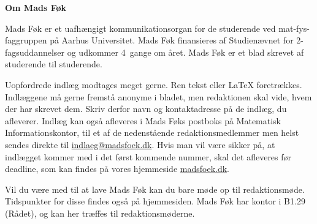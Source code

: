 \noindent\textbf{Om Mads Føk}

\noindent Mads Føk er et uafhængigt kommunikationsorgan for de studerende ved
mat-fys-faggruppen på Aarhus Universitet. Mads Føk finansieres af Studienævnet
for 2-fagsuddannelser og udkommer 4~gange om året. Mads Føk er et blad skrevet
af studerende til studerende.
\vspace{1mm}

Uopfordrede indlæg modtages meget gerne. Ren tekst eller \LaTeX\xspace
foretrækkes. Indlæggene må gerne fremstå anonyme i bladet, men redaktionen skal
vide, hvem der har skrevet dem. Skriv derfor navn og kontaktadresse på de
indlæg, du afleverer. Indlæg kan også afleveres i Mads Føks postboks på
Matematisk Informationskontor, til et af de nedenstående redaktionsmedlemmer
men helst sendes direkte til \url{indlaeg@madsfoek.dk}. Hvis man vil være
sikker på, at indlægget kommer med i det først kommende nummer, skal det
afleveres før deadline, som kan findes på vores hjemmeside \url{madsfoek.dk}.
\vspace{1mm}

Vil du være med til at lave Mads Føk kan du bare møde op til redaktionsmøde.
Tidspunkter for disse findes også på hjemmesiden. Mads Føk har kontor i B1.29
(Rådet), og kan her træffes til redaktionsmøderne.


